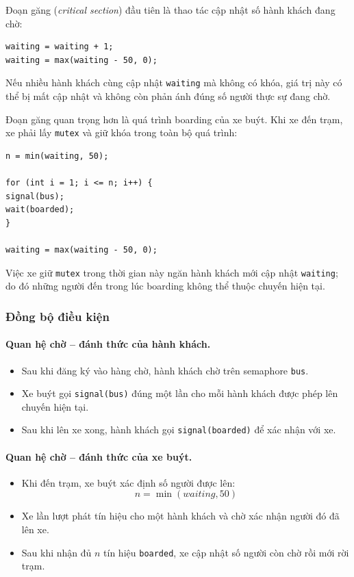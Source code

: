 Đoạn găng (\textit{critical section}) đầu tiên là thao tác cập nhật số
hành khách đang chờ:

\begin{lstlisting}
waiting = waiting + 1;
waiting = max(waiting - 50, 0);
\end{lstlisting}

Nếu nhiều hành khách cùng cập nhật \texttt{waiting} mà không có khóa,
giá trị này có thể bị mất cập nhật và không còn phản ánh đúng số người
thực sự đang chờ.

Đoạn găng quan trọng hơn là quá trình boarding của xe buýt. Khi xe đến
trạm, xe phải lấy \texttt{mutex} và giữ khóa trong toàn bộ quá trình:

\begin{lstlisting}
n = min(waiting, 50);

for (int i = 1; i <= n; i++) {
signal(bus);
wait(boarded);
}

waiting = max(waiting - 50, 0);
\end{lstlisting}

Việc xe giữ \texttt{mutex} trong thời gian này ngăn hành khách mới cập
nhật \texttt{waiting}; do đó những người đến trong lúc boarding không
thể thuộc chuyến hiện tại.

\subsubsection*{Đồng bộ điều kiện}

\paragraph{Quan hệ chờ -- đánh thức của hành khách.}

\begin{itemize}
\item Sau khi đăng ký vào hàng chờ, hành khách chờ trên semaphore
\texttt{bus}.
\item Xe buýt gọi \texttt{signal(bus)} đúng một lần cho mỗi hành
khách được phép lên chuyến hiện tại.
\item Sau khi lên xe xong, hành khách gọi
\texttt{signal(boarded)} để xác nhận với xe.
\end{itemize}

\paragraph{Quan hệ chờ -- đánh thức của xe buýt.}

\begin{itemize}
\item Khi đến trạm, xe buýt xác định số người được lên:
\[
n = \min(waiting, 50)
\]
\item Xe lần lượt phát tín hiệu cho một hành khách và chờ xác nhận
người đó đã lên xe.
\item Sau khi nhận đủ $n$ tín hiệu \texttt{boarded}, xe cập nhật số
người còn chờ rồi mới rời trạm.
\end{itemize}

